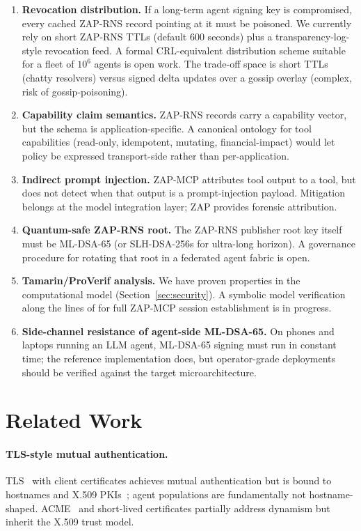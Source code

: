 \documentclass[11pt,a4paper]{article}
\theoremstyle{definition}
\theoremstyle{remark}
\newcommand{\zap}{\textsf{ZAP}\xspace}
\newcommand{\zapmcp}{\textsf{ZAP-MCP}\xspace}
\newcommand{\rns}{\textsf{ZAP-RNS}\xspace}
\begin{document}
\begin{enumerate}[leftmargin=2em,itemsep=0.25em]
\item \textbf{Revocation distribution.} If a long-term agent signing
key is compromised, every cached \rns{} record pointing at it must be
poisoned. We currently rely on short \rns{} TTLs (default 600 seconds)
plus a transparency-log-style revocation feed. A formal CRL-equivalent
distribution scheme suitable for a fleet of $10^6$ agents is open work.
The trade-off space is short TTLs (chatty resolvers) versus
signed delta updates over a gossip overlay (complex, risk of
gossip-poisoning).
\item \textbf{Capability claim semantics.} \rns{} records carry a
capability vector, but the schema is application-specific. A canonical
ontology for tool capabilities (read-only, idempotent, mutating,
financial-impact) would let policy be expressed transport-side rather
than per-application.
\item \textbf{Indirect prompt injection.} \zapmcp{} attributes
tool output to a tool, but does not detect when that output is a
prompt-injection payload. Mitigation belongs at the model integration
layer; \zap{} provides forensic attribution.
\item \textbf{Quantum-safe \rns{} root.} The \rns{} publisher root key
itself must be ML-DSA-65 (or SLH-DSA-256s for ultra-long horizon). A
governance procedure for rotating that root in a federated agent fabric
is open.
\item \textbf{Tamarin/ProVerif analysis.} We have proven properties in
the computational model (Section~\ref{sec:security}). A symbolic model
verification along the lines of \cite{cremers2017ake} for full
\zapmcp{} session establishment is in progress.
\item \textbf{Side-channel resistance of agent-side ML-DSA-65.} On
phones and laptops running an LLM agent, ML-DSA-65 signing must run in
constant time; the reference implementation does, but operator-grade
deployments should be verified against the target microarchitecture.
\end{enumerate}

\section{Related Work}

\paragraph{TLS-style mutual authentication.} TLS~\cite{rfc8446} with
client certificates achieves mutual authentication but is bound to
hostnames and X.509 PKIs~\cite{rfc5280}; agent populations are
fundamentally not hostname-shaped. ACME~\cite{rfc8555} and short-lived
certificates partially address dynamism but inherit the X.509 trust
model.
\end{document}
